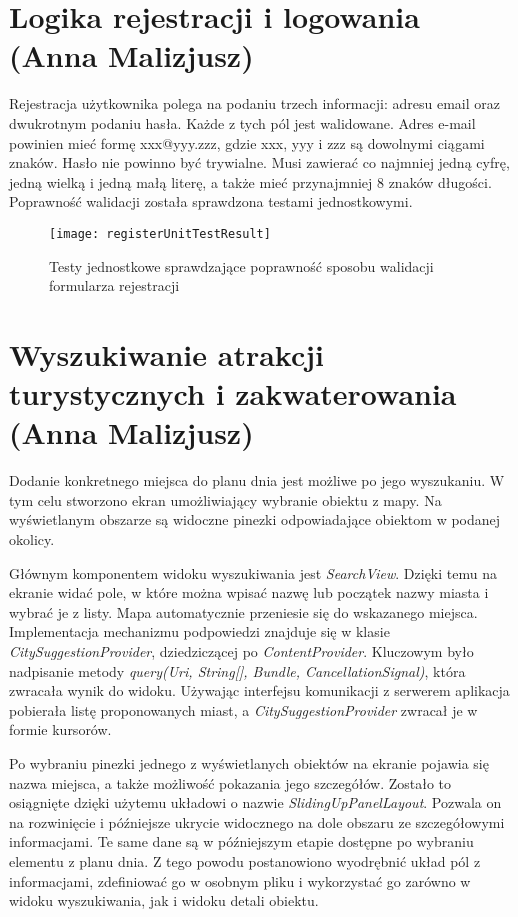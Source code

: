 \section{Logika rejestracji i logowania (Anna Malizjusz)}
\par Rejestracja użytkownika polega na podaniu trzech informacji: adresu email oraz dwukrotnym podaniu hasła. Każde z tych pól jest walidowane. Adres e-mail powinien mieć formę xxx@yyy.zzz, gdzie xxx, yyy i zzz są dowolnymi ciągami znaków. Hasło nie powinno być trywialne. Musi zawierać co najmniej jedną cyfrę, jedną wielką i jedną małą literę, a także mieć przynajmniej 8 znaków długości. Poprawność walidacji została sprawdzona testami jednostkowymi.

\begin{figure}[h]
\centering
\texttt{[image: registerUnitTestResult]}
\caption{Testy jednostkowe sprawdzające poprawność sposobu walidacji formularza rejestracji}
\label{fig:tokenPayload}
\end{figure}
\FloatBarrier


\section{Wyszukiwanie atrakcji turystycznych i zakwaterowania (Anna Malizjusz)}
\par Dodanie konkretnego miejsca do planu dnia jest możliwe po jego wyszukaniu. W tym celu stworzono ekran umożliwiający wybranie obiektu z mapy. Na wyświetlanym obszarze są widoczne pinezki odpowiadające obiektom w podanej okolicy.

\par Głównym komponentem widoku wyszukiwania jest \textit{SearchView}\cite{SearchView}. Dzięki temu na ekranie widać pole, w które można wpisać nazwę lub początek nazwy miasta i wybrać je z listy. Mapa automatycznie przeniesie się do wskazanego miejsca. Implementacja mechanizmu podpowiedzi znajduje się w klasie \textit{CitySuggestionProvider}, dziedziczącej po \textit{ContentProvider}\cite{ContentProvider}. Kluczowym było nadpisanie metody \textit{query(Uri, String[], Bundle, CancellationSignal)}, która zwracała wynik do widoku. Używając interfejsu komunikacji z serwerem aplikacja pobierała listę proponowanych miast, a \textit{CitySuggestionProvider} zwracał je w formie kursorów.

\par Po wybraniu pinezki jednego z wyświetlanych obiektów na ekranie pojawia się nazwa miejsca, a także możliwość pokazania jego szczegółów. Zostało to osiągnięte dzięki użytemu układowi o nazwie \textit{SlidingUpPanelLayout}\cite{SlidingUpPanelLayout}. Pozwala on na rozwinięcie i późniejsze ukrycie widocznego na dole obszaru ze szczegółowymi informacjami. Te same dane są w późniejszym etapie dostępne po wybraniu elementu z planu dnia. Z tego powodu postanowiono wyodrębnić układ pól z informacjami, zdefiniować go w osobnym pliku i wykorzystać go zarówno w widoku wyszukiwania, jak i widoku detali obiektu.

